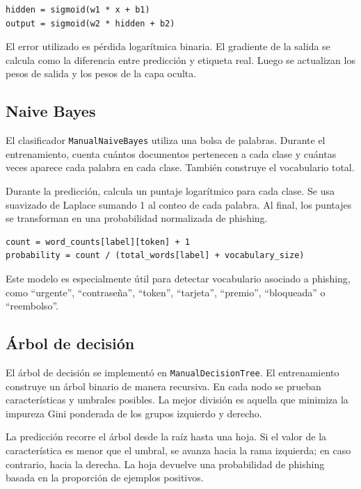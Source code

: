 \documentclass[12pt,letterpaper]{article}
\begin{document}
\begin{lstlisting}[style=pythonstyle, caption={Esquema de predicción de la red neuronal}]
hidden = sigmoid(w1 * x + b1)
output = sigmoid(w2 * hidden + b2)
\end{lstlisting}

El error utilizado es pérdida logarítmica binaria. El gradiente de la salida se calcula como la diferencia entre predicción y etiqueta real. Luego se actualizan los pesos de salida y los pesos de la capa oculta.

\subsection{Naive Bayes}

El clasificador \texttt{ManualNaiveBayes} utiliza una bolsa de palabras. Durante el entrenamiento, cuenta cuántos documentos pertenecen a cada clase y cuántas veces aparece cada palabra en cada clase. También construye el vocabulario total.

Durante la predicción, calcula un puntaje logarítmico para cada clase. Se usa suavizado de Laplace sumando 1 al conteo de cada palabra. Al final, los puntajes se transforman en una probabilidad normalizada de phishing.

\begin{lstlisting}[style=pythonstyle, caption={Idea central del suavizado de Laplace}]
count = word_counts[label][token] + 1
probability = count / (total_words[label] + vocabulary_size)
\end{lstlisting}

Este modelo es especialmente útil para detectar vocabulario asociado a phishing, como ``urgente'', ``contraseña'', ``token'', ``tarjeta'', ``premio'', ``bloqueada'' o ``reembolso''.

\subsection{Árbol de decisión}

El árbol de decisión se implementó en \texttt{ManualDecisionTree}. El entrenamiento construye un árbol binario de manera recursiva. En cada nodo se prueban características y umbrales posibles. La mejor división es aquella que minimiza la impureza Gini ponderada de los grupos izquierdo y derecho.

La predicción recorre el árbol desde la raíz hasta una hoja. Si el valor de la característica es menor que el umbral, se avanza hacia la rama izquierda; en caso contrario, hacia la derecha. La hoja devuelve una probabilidad de phishing basada en la proporción de ejemplos positivos.
\end{document}
